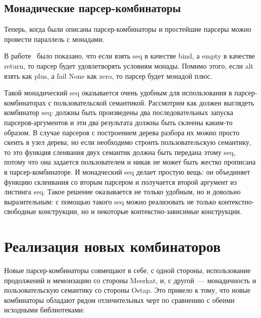 \documentclass[conference]{IEEEtran}
\begin{document}
\subsection{Монадические парсер-комбинаторы}
Теперь, когда были описаны парсер-комбинаторы и простейшие парсеры можно провести параллель с монадами.

В работе~\cite{wadler} было показано, что если взять seq в качестве bind, а empty в качестве return, то парсер будет удовлетворять условиям монады. Помимо этого, если alt взять как plus, а fail None как zero, то парсер будет монадой плюс.

Такой монадический seq оказывается очень удобным для использования в парсер-комбинаторах с пользовательской семантикой. Рассмотрим как должен выглядеть комбинатор seq: должны быть произведены два последовательных запуска парсеров-аргументов и эти два результата должны быть склеены каким-то образом. В случае парсеров с построением дерева разбора их можно просто скеить в узел дерева, но если необходимо строить пользовательскую семантику, то это функция слеивания двух семантик должна быть передана этому seq, потому что она задается пользователем и никак не может быть жестко прописана в парсер-комбинаторе. И монадческий seq делает простую вещь: он объединяет функцию склеивания со вторым парсером и получается второй аргумент из листинга seq. Такое решение оказывается не только удобным, но и довольно выразительным: с помощью такого seq можно реализовать не только контекстно-свободные конструкции, но и некоторые контекстно-зависимые конструкции.

\section{Реализация новых комбинаторов}

Новые парсер-комбинаторы совмещают в себе, с одной стороны, использование продолжений и мемоизацию со стороны Meerkat, и, с другой~--- монадичность и пользовательскую семантику со стороны Ostap.
Это привело к тому, что новые комбинаторы обладают рядом отличительных черт по сравнению с обеими исходными библиотеками:
\end{document}
